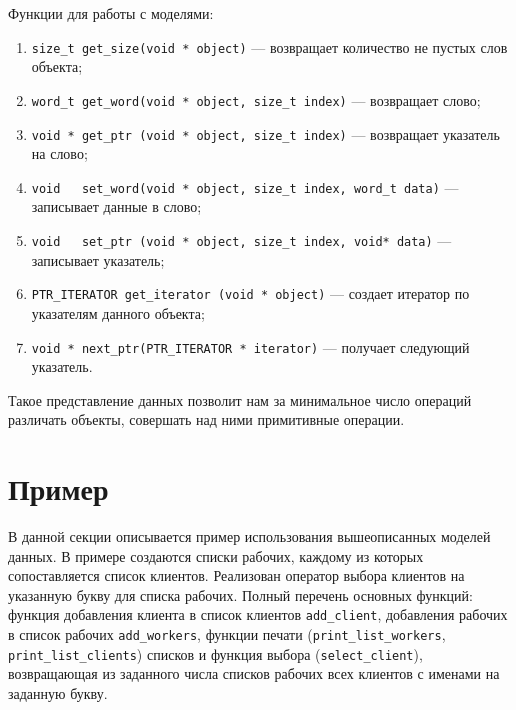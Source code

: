 Функции для работы с моделями:
\begin{enumerate}
\item \lstinline{size_t get_size(void * object)} --- возвращает количество не пустых слов объекта; 
\item \lstinline{word_t get_word(void * object, size_t index)} --- возвращает слово;
\item \lstinline{void * get_ptr (void * object, size_t index)} --- возвращает указатель на слово;
\item \lstinline{void   set_word(void * object, size_t index, word_t data)} --- записывает данные в слово;
\item \lstinline{void   set_ptr (void * object, size_t index, void* data)} --- записывает указатель;
\item \lstinline{PTR_ITERATOR get_iterator (void * object)} --- создает итератор по указателям данного объекта;
\item \lstinline{void * next_ptr(PTR_ITERATOR * iterator)} --- получает следующий указатель.
\end{enumerate}
Такое представление данных позволит нам за минимальное число операций различать объекты, совершать над ними примитивные операции.


\section{Пример}
В данной секции описывается пример использования вышеописанных моделей данных.
В примере создаются списки рабочих, каждому из которых сопоставляется список клиентов. Реализован оператор выбора клиентов на указанную букву для списка рабочих.
Полный перечень основных функций: функция добавления клиента в список клиентов \lstinline{add_client}, добавления рабочих в список рабочих \lstinline{add_workers}, 
функции печати (\lstinline{print_list_workers}, \lstinline{print_list_clients}) списков и функция выбора (\lstinline{select_client}),
возвращающая из заданного числа списков рабочих всех клиентов с именами на заданную букву.  

